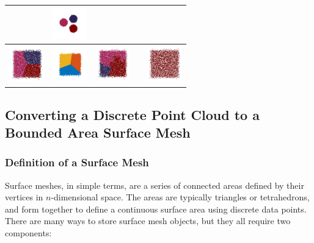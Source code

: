 \documentclass[12pt]{drexelthesis}
\let\Oldsubsection\subsection
\renewcommand{\subsection}{\FloatBarrier\Oldsubsection}
\let\Oldsubsubsection\subsubsection
\renewcommand{\subsubsection}{\FloatBarrier\Oldsubsubsection}
\begin{document}
\begin{table}[h!]
\begin{center}
\begin{tabular}{ | c | p{3cm} | p{3cm} | p{3cm} | p{3cm} | }
      &
            \includegraphics[trim={0 1.5cm 0 1.5cm},clip,width=1.5cm]{2d-cluster-tests/euclidean-distance/solid_circles.jpg}
      \\ \hline
      
            \includegraphics[trim={0 1cm 0 1cm},clip,width=1.5cm]{2d-cluster-tests/k-means/plane.jpg}
      & 
            \includegraphics[trim={0 0cm 0 1cm},clip,width=1.5cm]{2d-cluster-tests/fcm/plane.jpg}
      & 
            \includegraphics[trim={0 1cm 0 1cm},clip,width=1.5cm]{2d-cluster-tests/agglomerative/plane.jpg}
      &
      
      &
            \includegraphics[trim={0 1cm 0 1cm},clip,width=1.5cm]{2d-cluster-tests/euclidean-distance/plane.jpg}
      \\ \hline
      
      \end{tabular}
      \end{center}
      \end{table}


\subsection{Converting a Discrete Point Cloud to a Bounded Area Surface Mesh} 
\subsubsection{Definition of a Surface Mesh}
Surface meshes, in simple terms, are a series of connected areas defined by their vertices in $n$-dimensional space. The areas are typically triangles or tetrahedrons, and form together to define a continuous surface area using discrete data points. There are many ways to store surface mesh objects, but they all require two components:
\end{document}

